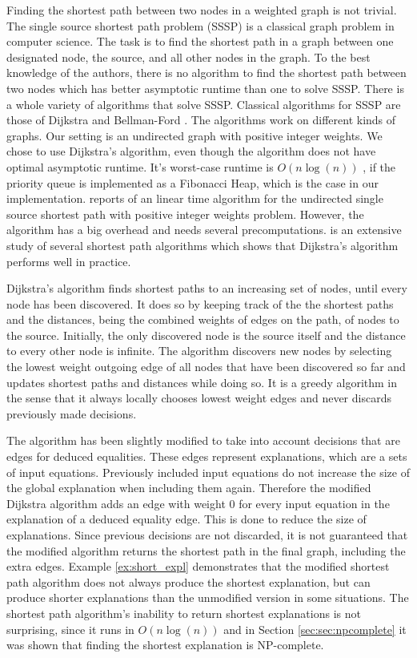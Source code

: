 Finding the shortest path between two nodes in a weighted graph is not trivial.
The single source shortest path problem (SSSP) is a classical graph problem in computer science.
The task is to find the shortest path in a graph between one designated node, the source, and all other nodes in the graph.
To the best knowledge of the authors, there is no algorithm to find the shortest path between two nodes which has better asymptotic runtime than one to solve SSSP.
There is a whole variety of algorithms that solve SSSP.
Classical algorithms for SSSP are those of Dijkstra \cite{Dijkstra1959} and Bellman-Ford \cite{Ford1956,Bellman1956}.
The algorithms work on different kinds of graphs.
Our setting is an undirected graph with positive integer weights.
We chose to use Dijkstra's algorithm, even though the algorithm does not have optimal asymptotic runtime.
It's worst-case runtime is $O(n \log(n))$ \cite{Cormen1989}, if the priority queue is implemented as a Fibonacci Heap, which is the case in our implementation.
\cite{Thorup1999} reports of an linear time algorithm for the undirected single source shortest path with positive integer weights problem.
However, the algorithm has a big overhead and needs several precomputations.
\cite{Cherkassky1996} is an extensive study of several shortest path algorithms which shows that Dijkstra's algorithm performs well in practice.

Dijkstra's algorithm finds shortest paths to an increasing set of nodes, until every node has been discovered.
It does so by keeping track of the the shortest paths and the distances, being the combined weights of edges on the path, of nodes to the source.
Initially, the only discovered node is the source itself and the distance to every other node is infinite.
The algorithm discovers new nodes by selecting the lowest weight outgoing edge of all nodes that have been discovered so far and updates shortest paths and distances while doing so.
It is a greedy algorithm in the sense that it always locally chooses lowest weight edges and never discards previously made decisions.

The algorithm has been slightly modified to take into account decisions that are edges for deduced equalities.
These edges represent explanations, which are a sets of input equations.
Previously included input equations do not increase the size of the global explanation when including them again.
Therefore the modified Dijkstra algorithm adds an edge with weight 0 for every input equation in the explanation of a deduced equality edge.
This is done to reduce the size of explanations.
Since previous decisions are not discarded, it is not guaranteed that the modified algorithm returns the shortest path in the final graph, including the extra edges.
Example \ref{ex:short_expl} demonstrates that the modified shortest path algorithm does not always produce the shortest explanation, but can produce shorter explanations than the unmodified version in some situations.
The shortest path algorithm's inability to return shortest explanations is not surprising, since it runs in $O(n \log(n))$ and in Section \ref{sec:sec:npcomplete} it was shown that finding the shortest explanation is NP-complete.

